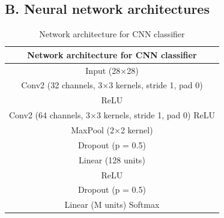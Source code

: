 \subsection*{B. Neural network architectures}\label{appendix:architectures}
\begin{table}[h]
	\centering
	\caption{Network architecture for CNN classifier}\label{tab:cnn_architecture}
	\begin{tabular}{|c|}
		\toprule[1.5pt]
		Network architecture for CNN classifier\\
		\hline
		Input (28×28)\\
		Conv2 (32 channels, 3×3 kernels, stride 1, pad 0) \\
		ReLU\\
		Conv2 (64 channels, 3×3 kernels, stride 1, pad 0) ReLU\\
		MaxPool (2×2 kernel)\\
		Dropout (p = 0.5)\\
		Linear (128 units)\\
		ReLU\\
		Dropout (p = 0.5)\\
		Linear (M units)
		Softmax\\
		\hline
	\end{tabular}
	

\end{table}
